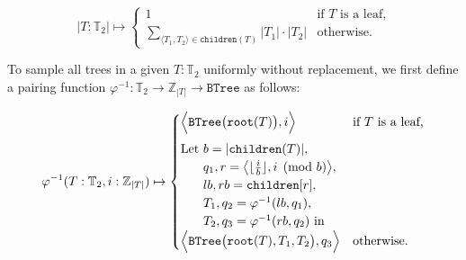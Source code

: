 \documentclass[sigplan,review,anonymous,acmsmall]{acmart}\settopmatter{printfolios=false,printccs=false,printacmref=false}
\begin{document}

  \begin{equation}
    |T: \mathbb{T}_2| \mapsto \begin{cases}
                                1  & \text{if $T$ is a leaf,} \\
                                \sum_{\langle T_1, T_2\rangle \in \texttt{children}(T)} |T_1| \cdot |T_2| & \text{otherwise.}
    \end{cases}
  \end{equation}

  To sample all trees in a given $T: \mathbb{T}_2$ uniformly without replacement, we first define a pairing function $\varphi^{-1}: \mathbb{T}_2 \rightarrow \mathbb{Z}_{|T|} \rightarrow \texttt{BTree}$ as follows:


  \begin{equation}
    \varphi^{-1}(T: \mathbb{T}_2, i: \mathbb{Z}_{|T|}) \mapsto \begin{cases}
                                                                 \Big\langle\texttt{BTree}\big(\texttt{root}(T)\big), i\Big\rangle & \text{if $T$ is a leaf,} \vspace{5pt}\\
                                                                 \text{Let } b = |\texttt{children}(T)|,\\
                                                                 \phantom{\text{Let }} q_1, r=\big\langle\lfloor\frac{i}{b}\rfloor, i \pmod{b}\big\rangle,\\
                                                                 \phantom{\text{Let }} lb, rb = \texttt{children}[r],\\
                                                                 \phantom{\text{Let }} T_1, q_2 = \varphi^{-1}(lb, q_1),\\
                                                                 \phantom{\text{Let }} T_2, q_3 = \varphi^{-1}(rb, q_2) \text{ in } \\
                                                                 \Big\langle\texttt{BTree}\big(\texttt{root}(T), T_1, T_2\big), q_3\Big\rangle & \text{otherwise.} \\
    \end{cases}
  \end{equation}
\end{document}
